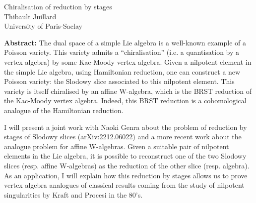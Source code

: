 \documentclass[12pt,a4paper]{article}
\begin{document}
\thispagestyle{empty} 
\begin{center}
{\large  Chiralisation of reduction by stages}\\
\vspace*{.5cm}
Thibault Juillard\\
University of Paris-Saclay\\
\end{center}
\vspace*{.8cm}

{\bf Abstract:} The dual space of a simple Lie algebra is a well-known example of a Poisson variety. This variety admits a ``chiralisation'' (i.e. a quantisation by a vertex algebra) by some Kac-Moody vertex algebra. Given a nilpotent element in the simple Lie algebra, using Hamiltonian reduction, one can construct a new Poisson variety: the Slodowy slice associated to this nilpotent element. This variety is itself chiralised by an affine W-algebra, which is the BRST reduction of the Kac-Moody vertex algebra. Indeed, this BRST reduction is a cohomological analogue of the Hamiltonian reduction. 

I will present a joint work with Naoki Genra about the problem of reduction by stages of Slodowy slices (arXiv:2212.06022) and a more recent work about the analogue problem for affine W-algebras. Given a suitable pair of nilpotent elements in the Lie algebra, it is possible to reconstruct one of the two Slodowy slices (resp. affine W-algebras) as the reduction of the other slice (resp. algebra). As an application, I will explain how this reduction by stages allows us to prove vertex algebra analogues of classical results coming from the study of nilpotent singularities by Kraft and Procesi in the 80's.
\end{document}
